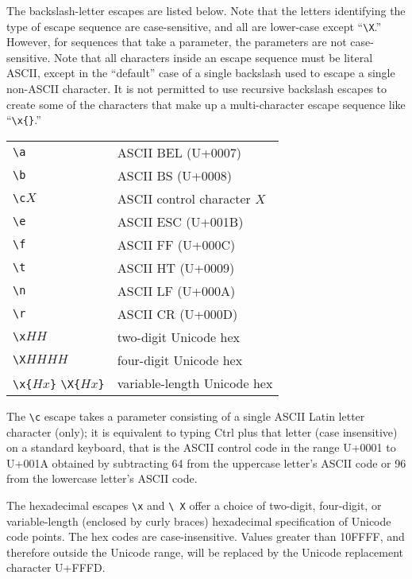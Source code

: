 \documentclass[twocolumn]{report}
\begin{document}
The backslash-letter escapes are listed below.  Note that the letters
identifying the type of escape sequence are case-sensitive, and all are
lower-case except ``\texttt{\textbackslash X}.''  However, for sequences
that take a parameter, the parameters are not case-sensitive.  Note that all
characters inside an escape sequence must be literal ASCII, except in the
``default'' case of a single backslash used to escape a single non-ASCII
character.  It is not permitted to use recursive backslash escapes to create
some of the characters that make up a multi-character escape sequence like
``\texttt{\textbackslash x\{\}}.''

\hspace*{\fill}
\begin{tabular}{ll}
  \texttt{\textbackslash a} & ASCII BEL (U+0007) \\
  \texttt{\textbackslash b} & ASCII BS (U+0008) \\
  \texttt{\textbackslash c}$X$ & ASCII control character $X$ \\
  \texttt{\textbackslash e} & ASCII ESC (U+001B) \\
  \texttt{\textbackslash f} & ASCII FF (U+000C) \\
  \texttt{\textbackslash t} & ASCII HT (U+0009) \\
  \texttt{\textbackslash n} & ASCII LF (U+000A) \\
  \texttt{\textbackslash r} & ASCII CR (U+000D) \\
  \texttt{\textbackslash x}$HH$ & two-digit Unicode hex \\
  \texttt{\textbackslash X}$HHHH$ & four-digit Unicode hex \\
  \texttt{\textbackslash x\{}$Hx$\texttt{\}}
    \texttt{\textbackslash X\{}$Hx$\texttt{\}} &
    variable-length Unicode hex
\end{tabular}
\hspace*{\fill}\par

The \texttt{\textbackslash c} escape takes a parameter consisting of a
single ASCII Latin letter character (only); it is equivalent to typing Ctrl
plus that letter (case insensitive) on a standard keyboard, that is the
ASCII control code in the range U+0001 to U+001A obtained by subtracting 64
from the uppercase letter's ASCII code or 96 from the lowercase letter's
ASCII code.

The hexadecimal escapes \texttt{\textbackslash x} and \texttt{\textbackslash
X} offer a choice of two-digit, four-digit, or variable-length (enclosed by
curly braces) hexadecimal specification of Unicode code points.  The hex
codes are case-insensitive.  Values greater than 10FFFF, and therefore
outside the Unicode range, will be replaced by the Unicode replacement
character U+FFFD.
\end{document}
